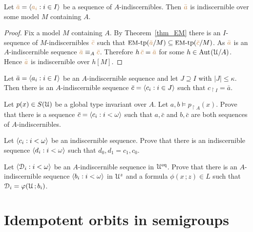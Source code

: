 \begin{proposition}\label{prop_indiscernibles_set_model}
Let ${\color{brown}\bar a}=\langle{\color{brown}a_i}:i\in I\rangle$ be a sequence of $A$-indiscernibles.
Then ${\color{brown}\bar a}$ is indiscernible over some model $M$ containing $A$.
\end{proposition}

\begin{proof}
Fix a model $M$ containing $A$.
By Theorem~\ref{thm_EM} there is an $I$-sequence of $M$-indiscernibles ${\color{brown}\bar c}$ such that $\mbox{{\small EM}-tp}({\color{brown}\bar a}/M)\subseteq\mbox{{\small EM}-tp}({\color{brown}\bar c}/M)$.
As ${\color{brown}\bar a}$ is an $A$-indiscernible sequence ${\color{brown}\bar a}\equiv_A{\color{brown}\bar c}$.
Therefore $h\,{\color{brown}\bar c}={\color{brown}\bar a}$ for some $h\in{\rm Aut\kern.15ex}(\EuScript U/A)$.
Hence ${\color{brown}\bar a}$ is indiscernible over $h[M]$.
\end{proof}

\begin{exercise}
  Let $\bar a=\langle a_i:i\in I\rangle$ be an $A$-indiscernible sequence and let $J\supseteq I$ with $|J|\le \kappa$.
  Then there is an $A$-indiscernible sequence $\bar c=\langle c_i:i\in J\rangle$ such that $c_{\restriction I}=\bar a$.
\end{exercise}

\begin{exercise}
  Let  $p(x)\in S(\EuScript U)$ be a global type invariant over $A$.
  Let $a,b\models p_{\restriction A}(x)$.
  Prove that there is a sequence $\bar c=\langle c_i:i<\omega\rangle$ such that $a,\bar c$ and $b,\bar c$ are both sequences of $A$-indiscernibles.
\end{exercise}

\begin{exercise}\label{ex_symmetry_ind}
  Let $\langle c_i:i<\omega\rangle$ be an indiscernible sequence.
  Prove that there is an indiscernible sequence $\langle d_i:i<\omega\rangle$ such that $d_0,d_1 = c_1,c_0$.
\end{exercise}

\begin{exercise}
  Let $\langle\EuScript D_i:i<\omega\rangle$ be an $A$-indiscernible sequence in $\EuScript U^{{\rm eq}}$.
  Prove that there is an $A$-indiscernible sequence $\langle b_i:i<\omega\rangle$ in $\EuScript U^z$ and a formula $\phi(x\,;z)\in L$ such that $\EuScript D_i=\varphi(\EuScript U\,;b_i)$.
\end{exercise}

\section{Idempotent orbits in semigroups}\label{semigroups}


